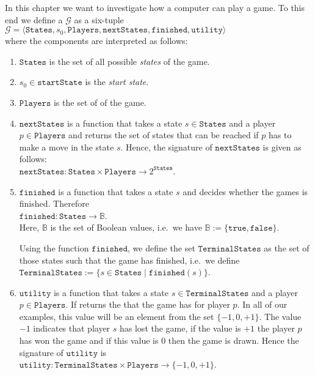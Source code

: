 In this chapter we want to investigate how a computer can play a game.  To this end we define a
 $\mathcal{G}$ as a six-tuple
\\[0.2cm]
\hspace*{1.3cm}
$\mathcal{G} = \langle \mathtt{States}, s_0, \mathtt{Players}, \mathtt{nextStates}, \mathtt{finished},\mathtt{utility} \rangle$
\\[0.2cm]
where the components are interpreted as follows:
\begin{enumerate}
\item $\mathtt{States}$ is the set of all possible \emph{\color{blue}states} of the game.
\item $s_0 \in \mathtt{startState}$ is the \emph{\color{blue}start state}.
\item $\mathtt{Players}$ is  the set of  of the game.
\item $\mathtt{nextStates}$ is a function that takes a state $s \in \mathtt{States}$ and a player $p \in \mathtt{Players}$ and returns the set of
      states that can be reached if $p$ has to make a move in the state $s$.  Hence, the signature of
      $\mathtt{nextStates}$ is given as follows:
      \\[0.2cm]
      \hspace*{1.3cm}
      $\mathtt{nextStates}: \mathtt{States} \times \mathtt{Players} \rightarrow 2^{\mathtt{States}}$.
\item $\mathtt{finished}$ is a function that takes a state $s$ and decides whether the games is finished.
      Therefore
      \\[0.2cm]
      \hspace*{1.3cm}
      $\mathtt{finished}: \mathtt{States} \rightarrow \mathbb{B}$.
      \\[0.2cm]
      Here, $\mathbb{B}$ is the set of Boolean values, i.e.~we have $\mathbb{B} := \{ \mathtt{true}, \mathtt{false} \}$.
  
      Using the function $\mathtt{finished}$, we define the set $\mathtt{TerminalStates}$ as the set of those
      states such that the game has finished,  i.e.~we define
      \\[0.2cm]
      \hspace*{1.3cm}
      $\mathtt{TerminalStates} := \{ s \in \mathtt{States} \mid \mathtt{finished}(s) \}$.
\item $\mathtt{utility}$ is a function that takes a state $s \in \mathtt{TerminalStates}$ and a player $p \in \mathtt{Players}$.  If returns
      the  that the game has for player $p$.  In all of our examples, this value will be an element
      from the set $\{-1, 0, +1\}$.  The value $-1$ indicates that player $s$ has lost the game,
      if the value is $+1$ the player $p$ has won the game and if this value is $0$ then the game is drawn.
      Hence the signature of $\mathtt{utility}$ is
      \\[0.2cm]
      \hspace*{1.3cm}
      $\mathtt{utility}: \mathtt{TerminalStates} \times \mathtt{Players} \rightarrow \{ -1, 0, +1\}$.
\end{enumerate}


